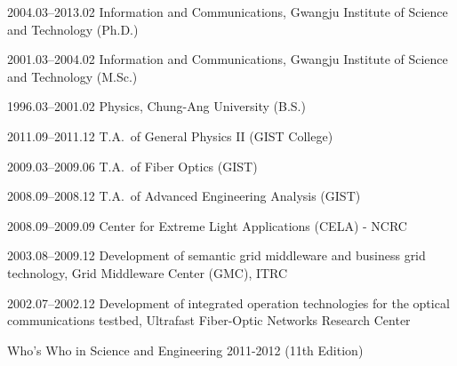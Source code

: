 \documentclass{gist}
\begin{document}
\vitae
\begin{education}{2cm}
\item[2004.03--2013.02] Information and Communications, Gwangju Institute of Science and Technology (Ph.D.)
\item[2001.03--2004.02] Information and Communications, Gwangju Institute of Science and Technology (M.Sc.)
\item[1996.03--2001.02] Physics, Chung-Ang University (B.S.)
\end{education}

\begin{experience}{2cm}
\item[2011.09--2011.12] T.A.~of General Physics II (GIST College)
\item[2009.03--2009.06] T.A.~of Fiber Optics (GIST)
\item[2008.09--2008.12] T.A.~of Advanced Engineering Analysis (GIST)
\item[2008.09--2009.09] Center for Extreme Light Applications (CELA) - NCRC
\item[2003.08--2009.12] Development of semantic grid middleware and business grid technology, Grid Middleware Center (GMC), ITRC
\item[2002.07--2002.12] Development of integrated operation technologies for the optical communications testbed, Ultrafast Fiber-Optic Networks Research Center
\end{experience}


\begin{award}
\item Who's Who in Science and Engineering 2011-2012 (11th Edition)
\end{award}
\end{document}
